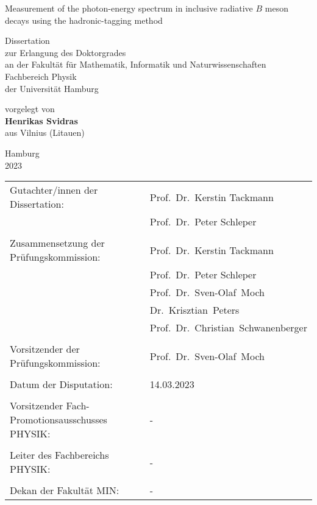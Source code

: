 \thispagestyle{empty}
\begin{center}
\huge{Measurement of the photon-energy spectrum in inclusive radiative $B$ meson
decays using the hadronic-tagging method}

\vspace{0.2\textheight}
\large{Dissertation \\ zur Erlangung des Doktorgrades \\ an der Fakult\"at f\"ur Mathematik, Informatik und Naturwissenschaften \\ Fachbereich Physik \\ der Universit\"at Hamburg}

\vspace{0.2\textheight}
\large{vorgelegt von \\ \textbf{Henrikas Svidras} \\ aus Vilnius (Litauen)}

\vspace{0.1\textheight}
\large{Hamburg \\ 2023}
\end{center}

\newpage
\thispagestyle{empty}

\newpage
\thispagestyle{empty}

\vspace*{\fill}

\begin{tabular*}{\textwidth}{l @{\extracolsep{\fill}} l}
Gutachter/innen der Dissertation: & Prof.~Dr.~Kerstin Tackmann  \\
& Prof.~Dr.~Peter Schleper \\
\\
Zusammensetzung der Prüfungskommission: & Prof.~Dr.~Kerstin Tackmann\\
& Prof.~Dr.~Peter Schleper\\
& Prof.~Dr.~Sven-Olaf~Moch \\
& Dr.~Krisztian~Peters  \\
& Prof.~Dr.~Christian~Schwanenberger \\
\\
Vorsitzender der Prüfungskommission: & Prof.~Dr.~Sven-Olaf~Moch \\
\\
Datum der Disputation: & 14.03.2023 \\ %
\\
Vorsitzender Fach-Promotionsausschusses PHYSIK: &  - \\
\\
Leiter des Fachbereichs PHYSIK: & - \\
\\
Dekan der Fakultät MIN: & - \\
\end{tabular*}

\newpage
\thispagestyle{empty}
